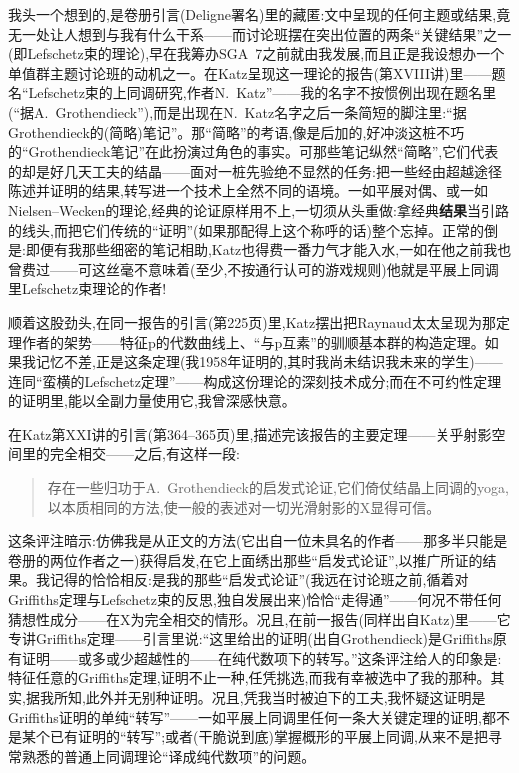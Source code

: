 我头一个想到的,是卷册引言(Deligne署名)里的藏匿:文中呈现的任何主题或结果,竟无一处让人想到与我有什么干系——而讨论班摆在突出位置的两条“关键结果”之一(即Lefschetz束的理论),早在我筹办SGA~7之前就由我发展,而且正是我设想办一个单值群主题讨论班的动机之一。在Katz呈现这一理论的报告(第XVIII讲)里——题名“Lefschetz束的上同调研究,作者N.~Katz”——我的名字不按惯例出现在题名里(“据A.~Grothendieck”),而是出现在N.~Katz名字之后一条简短的脚注里:“据Grothendieck的(简略)笔记”。那“简略”的考语,像是后加的,好冲淡这桩不巧的“Grothendieck笔记”在此扮演过角色的事实。可那些笔记纵然“简略”,它们代表的却是好几天工夫的结晶——面对一桩先验绝不显然的任务:把一些经由超越途径陈述并证明的结果,转写进一个技术上全然不同的语境。一如平展对偶、或一如Nielsen--Wecken的理论\dmark{},经典的论证原样用不上,一切须从头重做:拿经典\textbf{结果}当引路的线头,而把它们传统的“证明”(如果那配得上这个称呼的话)整个忘掉。正常的倒是:即便有我那些细密的笔记相助,Katz也得费一番力气才能入水,一如在他之前我也曾费过——可这丝毫不意味着(至少,不按通行认可的游戏规则)他就是平展上同调里Lefschetz束理论的作者!

顺着这股劲头,在同一报告的引言(第225页)里,Katz摆出把Raynaud太太呈现为那定理作者的架势——特征p的代数曲线上、“与p互素”的驯顺基本群的构造定理。如果我记忆不差,正是这条定理(我1958年证明的,其时我尚未结识我未来的学生)——连同“蛮横的Lefschetz定理”——构成这份理论的深刻技术成分;而在不可约性定理的证明里,能以全副力量使用它,我曾深感快意。

在Katz第XXI讲的引言(第364--365页)里,描述完该报告的主要定理——关乎射影空间里的完全相交——之后,有这样一段:

\begin{quote}
存在一些归功于A.~Grothendieck的启发式论证,它们倚仗结晶上同调的yoga,以本质相同的方法,使一般的表述对一切光滑射影的X显得可信。
\end{quote}

这条评注暗示:仿佛我是从正文的方法(它出自一位未具名的作者——那多半只能是卷册的两位作者之一)获得启发,在它上面绣出那些“启发式论证”,以推广所证的结果。我记得的恰恰相反:是我的那些“启发式论证”(我远在讨论班之前,循着对Griffiths定理与Lefschetz束的反思,独自发展出来)恰恰“走得通”\dmark{}——何况不带任何猜想性成分——在X为完全相交的情形。况且,在前一报告(同样出自Katz)里——它专讲Griffiths定理——引言里说:“这里给出的证明(出自Grothendieck)是Griffiths原有证明——或多或少超越性的——在纯代数项下的转写。”这条评注给人的印象是:特征任意的Griffiths定理,证明不止一种,任凭挑选,而我有幸被选中了我的那种。其实,据我所知,此外并无别种证明。况且,凭我当时被迫下的工夫,我怀疑这证明是Griffiths证明的单纯“转写”——一如平展上同调里任何一条大关键定理的证明,都不是某个已有证明的“转写”;或者(干脆说到底)掌握概形的平展上同调,从来不是把寻常熟悉的普通上同调理论“译成纯代数项”的问题。


